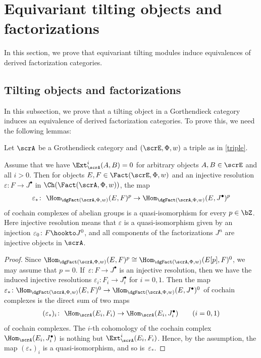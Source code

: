 \section{Equivariant tilting objects and factorizations}

In this section, we prove that equivariant tilting modules induce equivalences of derived factorization categories.

\subsection{Tilting objects and factorizations}\label{general morita}
In this subsection, we prove that a tilting object in a Gorthendieck category induces an equivalence of derived factorization categories. To prove this, we need the following lemmas:


Let $\scrA$ be a Grothendieck category and $(\scrE,\Phi,w)$ a triple as in \eqref{triple}.
\begin{lem}\label{qis}
Assume that we have $\Ext^i_{\scrA}(A,B)=0$ for arbitrary objects $A,B\in \scrE$ and all $i>0$. Then for objects $E,F\in \Fact(\scrE,\Phi,w)$ and an injective resolution $\varepsilon\colon F\to J^{\bullet}$ in $\Ch(\Fact(\scrA,\Phi,w))$, the map
\begin{gather*}
\varepsilon_*\colon\ \Hom_{\dgFact(\scrA,\Phi,w)}(E,F)^p\to\Hom_{\dgFact(\scrA,\Phi,w)}(E,J^{\bullet})^p
\end{gather*}
of cochain complexes of abelian groups is a quasi-isomorphism for every $p\in \bZ$. Here injective resolution means that $\varepsilon$ is a quasi-isomorphism given by an injection $\varepsilon_0\colon F\hookto J^0$, and all components of the factorizations $J^n$ are injective objects in $\scrA$.

\begin{proof}
Since $\Hom_{\dgFact(\scrA,\Phi,w)}(E,F)^p\cong \Hom_{\dgFact(\scrA,\Phi,w)}(E[p],F)^0$, we may assume that $p=0$. If~$\varepsilon\colon F\to J^{\bullet}$ is an injective resolution, then we have the induced injective resolutions $\varepsilon_i\colon F_i\to J^{\bullet}_i$ for $i=0,1$.
Then the map $\varepsilon_*\colon \Hom_{\dgFact(\scrA,\Phi,w)}(E,F)^0\to\Hom_{\dgFact(\scrA,\Phi,w)}(E,J^{\bullet})^0$ of cochain complexes is the direct sum of two maps
\begin{gather*}
(\varepsilon_*)_i\colon\ \Hom_{\scrA}(E_i,F_i)\to \Hom_{\scrA}(E_i,J^{\bullet}_i)\qquad (i=0,1)
\end{gather*}
of cochain complexes. The $i$-th cohomology of the cochain complex $\Hom_{\scrA}(E_i,J^{\bullet}_i)$ is nothing but $\Ext^i_{\scrA}(E_i,F_i)$. Hence, by the assumption, the map $(\varepsilon_*)_i$ is a quasi-isomorphism, and so is~$\varepsilon_*$.
\end{proof}
\end{lem}


